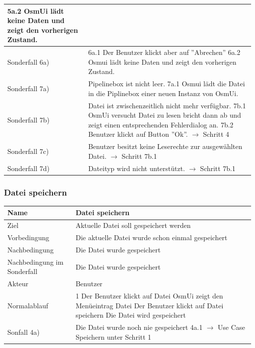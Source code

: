 \documentclass[a4paper,12pt]{scrartcl}
\begin{document}
\begin{center}
\begin{tabular}{|p{5cm}|p{10cm}|}
\newline 5a.2 OsmUi lädt keine Daten und zeigt den vorherigen Zustand.\\
\hline Sonderfall 6a) & 6a.1 Der Benutzer klickt aber auf ''Abrechen''
\newline 6a.2 Osmui lädt keine Daten und zeigt den vorherigen Zustand.\\
\hline Sonderfall 7a) & Pipelinebox ist nicht leer.
\newline 7a.1 Osmui lädt die Datei in die Piplinebox einer neuen Instanz von OsmUi.\\
\hline Sonderfall 7b)& Datei ist zwischenzeitlich nicht mehr verfügbar.
\newline 7b.1 OsmUi versucht Datei zu lesen bricht dann ab und zeigt einen entsprechenden Fehlerdialog an.
\newline 7b.2 Benutzer klickt auf Button ''Ok''.
\newline $ \rightarrow$ Schritt 4\\
\hline Sonderfall 7c)& Benutzer besitzt keine Leserechte zur ausgewählten Datei.
\newline $ \rightarrow$ Schritt 7b.1 \\
\hline Sonderfall 7d)& Dateityp wird nicht unterstützt.
\newline $ \rightarrow$ Schritt 7b.1 \\
\hline 
\end{tabular} 
\end{center}
\subsubsection{Datei speichern}
\begin{center}
\begin{tabular}{|p{5cm}|p{10cm}|}
\hline Name & \textbf{Datei speichern} \\ 
\hline Ziel & Aktuelle Datei soll gespeichert werden \\ 
\hline Vorbedingung & Die aktuelle Datei wurde schon einmal gespeichert \\ 
\hline Nachbedingung & Die Datei wurde gespeichert \\ 
\hline Nachbedingung im Sonderfall & Die Datei wurde gespeichert \\ 
\hline Akteur & Benutzer \\ 
\hline Normalablauf & 1 Der Benutzer klickt auf Datei
\newline 2 OsmUi zeigt den Menüeintrag Datei
\newline 3 Der Benutzer klickt auf Datei speichern
\newline 4 Die Datei wird gespeichert\\
\hline Sonfall 4a) & Die Datei wurde noch nie gespeichert
\newline 4a.1 $ \rightarrow$ Use Case Speichern unter Schritt 1\\
\hline 
\end{tabular}
\end{center}
\end{document}
